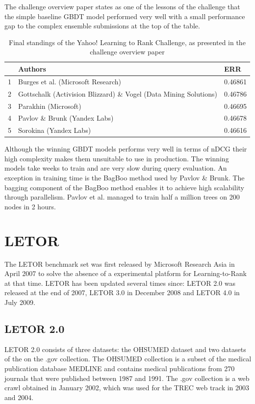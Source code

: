 The challenge overview paper \cite{Chapelle2011a} states as one of the lessons of the challenge that the simple baseline \ac{GBDT} model performed very well with a small performance gap to the complex ensemble submissions at the top of the table.\\

\begin{table}
\begin{tabular}{l|p{6.3cm}|l}
 & Authors & ERR \\
 \hline 
1 & Burges et al. (Microsoft Research) & 0.46861 \\ 
2 & Gottschalk (Activision Blizzard) \& Vogel (Data Mining Solutions) & 0.46786 \\ 
3 & Parakhin (Microsoft) & 0.46695 \\ 
4 & Pavlov \& Brunk (Yandex Labs) & 0.46678 \\ 
5 & Sorokina (Yandex Labs) & 0.46616 \\ 
\end{tabular}
\caption{Final standings of the Yahoo! Learning to Rank Challenge, as presented in the challenge overview paper \cite{Chapelle2011a}}
\label{fig:yahoo_results}
\end{table}

Although the winning \ac{GBDT} models performs very well in terms of \ac{nDCG} their high complexity makes them unsuitable to use in production. The winning models take weeks to train and are very slow during query evaluation. An exception in training time is the BagBoo \cite{Pavlov2010} method used by Pavlov \& Brunk. The bagging component of the BagBoo method enables it to achieve high scalability through parallelism. Pavlov et al. \cite{Pavlov2010} managed to train half a million trees on 200 nodes in 2 hours.

\section{LETOR}
The LETOR benchmark set was first released by Microsoft Research Asia in April 2007 \cite{Liu2007b} to solve the absence of a experimental platform for Learning-to-Rank at that time. LETOR has been updated several times since: LETOR 2.0 was released at the end of 2007, LETOR 3.0 in December 2008 and LETOR 4.0 in July 2009.

\subsection{LETOR 2.0}
LETOR 2.0 consists of three datasets: the OHSUMED dataset and two datasets of the on the .gov collection. The OHSUMED collection is a subset of the medical publication database MEDLINE and contains medical publications from 270 journals that were published between 1987 and 1991. The .gov collection is a web crawl obtained in January 2002, which was used for the \ac{TREC} web track in 2003 and 2004.\\

